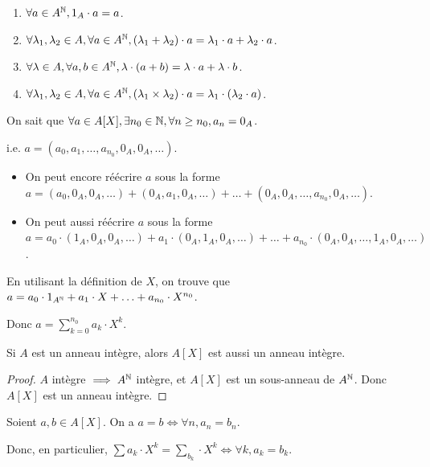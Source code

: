 \documentclass[12pt, a4paper]{report}
\begin{document}
\begin{property}
    \begin{enumerate}
        \item $\forall a \in A^{\mathbb{N}}, 1_A \cdot a = a$.
        \item $\forall \lambda_1,\lambda_2 \in A, \forall a \in A^{\mathbb{N}}, (\lambda_1 + \lambda_2) \cdot a = \lambda_1 \cdot a + \lambda_2 \cdot a$.
        \item $\forall \lambda \in A, \forall a,b \in A^{\mathbb{N}}, \lambda \cdot (a + b) = \lambda \cdot a + \lambda \cdot b$.
        \item $\forall \lambda_1,\lambda_2 \in A, \forall a \in A^{\mathbb{N}}, (\lambda_1 \times \lambda_2) \cdot a = \lambda_1 \cdot (\lambda_2 \cdot a)$.
    \end{enumerate}

    On sait que $\forall a \in A[X], \exists n_0 \in \mathbb{N}, \forall n \ge n_0, a_n = 0_A$.

    i.e. $a = (a_0, a_1, \ldots, a_{n_0}, 0_A, 0_A, \ldots)$.

    \begin{itemize}
        \item On peut encore réécrire $a$ sous la forme $a = (a_0, 0_A, 0_A, \ldots) + (0_A, a_1, 0_A, \ldots) + \ldots + (0_A, 0_A, \ldots, a_{n_0}, 0_A, \ldots)$.

        \item On peut aussi réécrire $a$ sous la forme $a = a_0 \cdot (1_A, 0_A, 0_A, \ldots) + a_1 \cdot (0_A, 1_A, 0_A, \ldots) + \ldots + a_{n_0} \cdot (0_A, 0_A, \ldots, 1_A, 0_A, \ldots)$.
    \end{itemize}

    En utilisant la définition de $X$, on trouve que $a = a_0 \cdot 1_{A^{\mathbb{N}}} + a_1 \cdot X + \ldots + a_{n_0} \cdot X^{n_0}$.

    Donc $a = \sum_{k=0}^{n_0}a_k \cdot X^k$.
\end{property}

\begin{property}
    Si $A$ est un anneau intègre, alors $A[X]$ est aussi un anneau intègre.
\end{property}

\begin{proof}
    $A$ intègre $\implies A^{\mathbb{N}}$ intègre, et $A[X]$ est un sous-anneau de $A^{\mathbb{N}}$. Donc $A[X]$ est un anneau intègre.
\end{proof}

\begin{property}
    Soient $a,b \in A[X]$. On a $a = b \iff \forall n, a_n = b_n$.

    Donc, en particulier, $\sum a_k\cdot X^k = \sum_{b_k}\cdot X^k \iff \forall k, a_k = b_k$.
\end{property}
\end{document}
